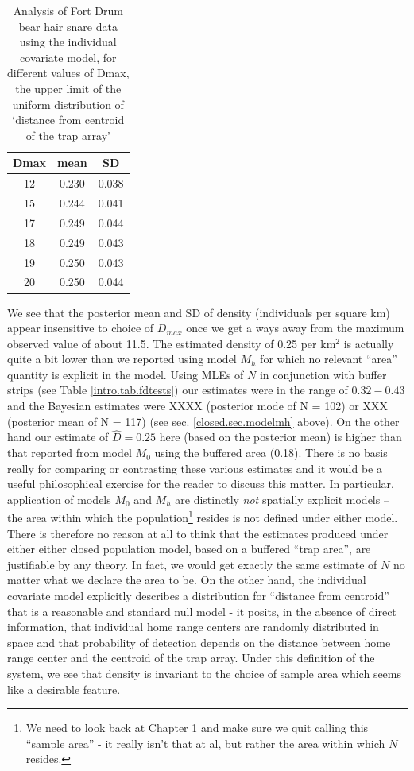 \begin{table}[htp]
\centering
\caption{Analysis of Fort Drum bear hair snare data using the individual covariate model, for different values of Dmax, the upper limit of the uniform distribution of `distance from centroid of the trap array' }
\begin{tabular}{ccc}
\hline \hline
 Dmax & mean & SD \\ \hline
  12& 0.230 & 0.038 \\
  15& 0.244 &0.041 \\
  17& 0.249 &0.044 \\
  18& 0.249 &0.043\\
  19& 0.250 &0.043\\
  20& 0.250 &0.044
\end{tabular}
\label{closed.tab.Dmax}
\end{table}


We see that the posterior mean and SD of density (individuals per
square km) appear insensitive to choice of $D_{max}$ once we get a 
ways away from the maximum observed value of about 11.5. The estimated
density of 0.25 per km$^2$ is actually quite a bit lower than we 
reported using model $M_h$ 
for which  no relevant ``area'' quantity is explicit in the model.
Using MLEs of $N$ in conjunction with buffer strips
(see Table \ref{intro.tab.fdtests}) our estimates were in the range of $0.32-0.43$ and
the Bayesian estimates were XXXX (posterior mode of N = 102) or XXX (posterior mean of N = 117)
(see sec.
\ref{closed.sec.modelmh} above). 
On the other hand our estimate of $\hat{D} = 0.25$ here (based on the posterior mean) is 
higher than that reported from model $M_0$ using the buffered area
(0.18). There is no basis really for comparing or contrasting these
various estimates and it would be a useful philosophical exercise for
the reader to discuss this matter. In particular, application of models
$M_0$ and $M_h$ are distinctly {\it not} spatially explicit models -- the
area within which the population\footnote{We need to look back at
  Chapter 1 and make sure we quit calling this ``sample area'' - it
  really isn't that at al, but rather the area within which $N$
  resides.} resides is not defined under either model. There is
therefore no reason at all to think that the estimates produced under
either either closed population model, based on a buffered ``trap area'', 
are justifiable by any
theory. In fact, we would get exactly the same estimate of $N$ no
matter what we declare the area to be. On the other hand, the
individual covariate model explicitly describes a distribution for
``distance from centroid'' that is a reasonable and standard null
model - it posits, in the absence of direct information, that
individual home range centers are randomly distributed in space and
that probability of detection depends on the distance between home
range center and the centroid of the trap array. Under this definition
of the system, we see that density is invariant to the choice of
sample area which seems like a desirable feature. 

